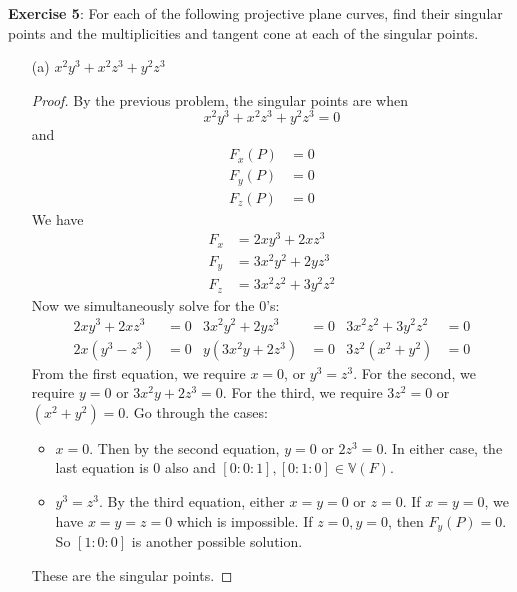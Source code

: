 \documentclass{article}
\begin{document}
\textbf{Exercise 5}: For each of the following projective plane curves, find their singular points and the multiplicities and tangent cone at each of the singular points.
    \begin{itemize}
        \item [(a)] $x^{2}y^{3} + x^{2}z^{3} + y^{2}z^{3}$
            \begin{proof}
                By the previous problem, the singular points are when 
                    \begin{equation*}
                        x^{2}y^{3} + x^{2}z^{3} + y^{2}z^{3} = 0
                    \end{equation*}
                and
                    \begin{align*}
                        F_{x}(P) &= 0 \\
                        F_{y}(P) &= 0 \\
                        F_{z}(P) &= 0   
                    \end{align*}
                We have
                    \begin{align*}
                        F_{x} &= 2xy^{3} + 2xz^{3}     \\
                        F_{y} &= 3x^{2}y^{2} + 2yz^{3} \\
                        F_{z} &= 3x^{2}z^{2} + 3y^{2}z^{2}    
                    \end{align*}
                Now we simultaneously solve for the $0$'s:
                    \begin{align*}
                        2xy^{3} + 2xz^{3} &= 0 & 3x^{2}y^{2} + 2yz^{3} &= 0 & 3x^{2}z^{2} + 3y^{2}z^{2} &= 0 \\
                        2x(y^{3} - z^{3}) &= 0 & y(3x^{2}y + 2z^{3})   &= 0 & 3z^{2}(x^{2} + y^{2})     &= 0   
                    \end{align*}
                From the first equation, we require $x = 0$, or $y^{3} = z^{3}$. For the second, we require $y = 0$ or $3x^{2}y + 2z^{3} = 0$. For the third, we require $3z^{2} = 0$ or $(x^{2} + y^{2}) = 0$. Go through the cases:
                    \begin{itemize}
                        \item $x = 0$. Then by the second equation, $y = 0$ or $2z^{3} = 0$. In either case, the last equation is $0$ also and $[0 : 0 : 1], [0 : 1 : 0] \in \mathbb{ V}(F)$.

                        \item $y^{3} = z^{3}$. By the third equation, either $x = y = 0$ or $z = 0$. If $x = y = 0$, we have $x = y = z = 0$ which is impossible. If $z = 0, y = 0$, then $F_{y}(P) = 0$. So $[1 : 0 : 0]$ is another possible solution.
                    \end{itemize}
                These are the singular points. 


\end{proof}
\end{itemize}
\end{document}

